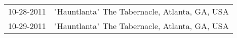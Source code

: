 \begin{supertabular}{ll}
 10-28-2011 &  "Hauntlanta" The Tabernacle, Atlanta, GA, USA \\
 10-29-2011 &  "Hauntlanta" The Tabernacle, Atlanta, GA, USA \\
\end{supertabular}
